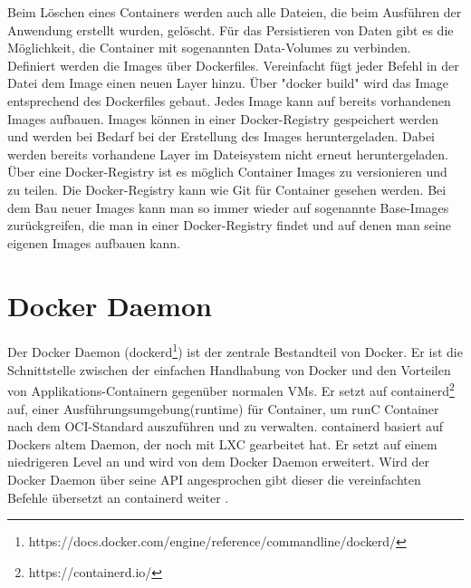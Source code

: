 \noindent Beim Löschen eines Containers werden auch alle Dateien, die beim Ausführen der Anwendung erstellt wurden, gelöscht. Für das Persistieren von Daten gibt es die Möglichkeit, die Container mit sogenannten Data-Volumes zu verbinden.\\

\noindent Definiert werden die Images über Dockerfiles. Vereinfacht fügt jeder Befehl in der Datei dem Image einen neuen Layer hinzu. Über "docker build" wird das Image entsprechend des Dockerfiles gebaut. Jedes Image kann auf bereits vorhandenen Images aufbauen. Images können in einer Docker-Registry gespeichert werden und werden bei Bedarf bei der Erstellung des Images heruntergeladen. Dabei werden bereits vorhandene Layer im Dateisystem nicht erneut heruntergeladen.\\

\noindent Über eine Docker-Registry ist es möglich Container Images zu versionieren und zu teilen. Die Docker-Registry kann wie Git für Container gesehen werden. Bei dem Bau neuer Images kann man so immer wieder auf sogenannte Base-Images zurückgreifen, die man in einer Docker-Registry findet und auf denen man seine eigenen Images aufbauen kann.


\section{Docker Daemon}

Der Docker Daemon (dockerd\footnote{https://docs.docker.com/engine/reference/commandline/dockerd/}) ist der zentrale Bestandteil von Docker. Er ist die Schnittstelle zwischen der einfachen Handhabung von Docker und den Vorteilen von Applikations-Containern gegenüber normalen VMs. Er setzt auf containerd\footnote{https://containerd.io/} auf, einer Ausführungsumgebung(runtime) für Container, um runC Container nach dem OCI-Standard auszuführen und zu verwalten. containerd basiert auf Dockers altem Daemon, der noch mit LXC gearbeitet hat. Er setzt auf einem niedrigeren Level an und wird von dem Docker Daemon erweitert. Wird der Docker Daemon über seine API angesprochen gibt dieser die vereinfachten Befehle übersetzt an containerd weiter \cite{docker:daemon}.\\


